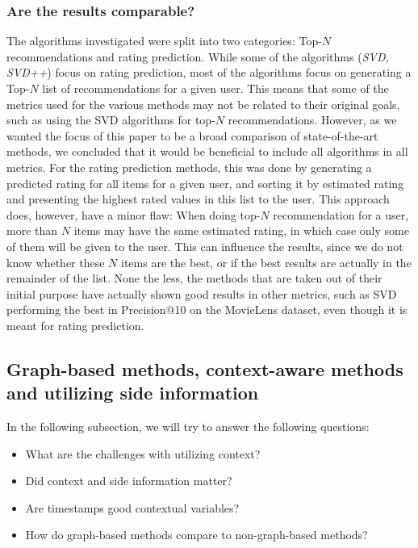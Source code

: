 \subsubsection{Are the results comparable?}
The algorithms investigated were split into two categories: Top-$N$ recommendations and rating prediction.
While some of the algorithms (\textit{SVD, SVD++}) focus on rating prediction, most of the algorithms focus on generating a Top-$N$ list of recommendations for a given user.
This means that some of the metrics used for the various methods may not be related to their original goals, such as using the SVD algorithms for top-$N$ recommendations.
However, as we wanted the focus of this paper to be a broad comparison of state-of-the-art methods, we concluded that it would be beneficial to include all algorithms in all metrics.
For the rating prediction methods, this was done by generating a predicted rating for all items for a given user, and sorting it by estimated rating and presenting the highest rated values in this list to the user.
This approach does, however, have a minor flaw: When doing top-$N$ recommendation for a user, more than $N$ items may have the same estimated rating, in which case only some of them will be given to the user.
This can influence the results, since we do not know whether these $N$ items are the best, or if the best results are actually in the remainder of the list.
None the less, the methods that are taken out of their initial purpose have actually shown good results in other metrics, such as SVD performing the best in Precision@10 on the MovieLens dataset, even though it is meant for rating prediction.

\subsection{Graph-based methods, context-aware methods and utilizing side information}
In the following subsection, we will try to answer the following questions: 
\begin{itemize}
    \item What are the challenges with utilizing context?
    \item Did context and side information matter?
    \item Are timestamps good contextual variables?
    \item How do graph-based methods compare to non-graph-based methods?
\end{itemize}


